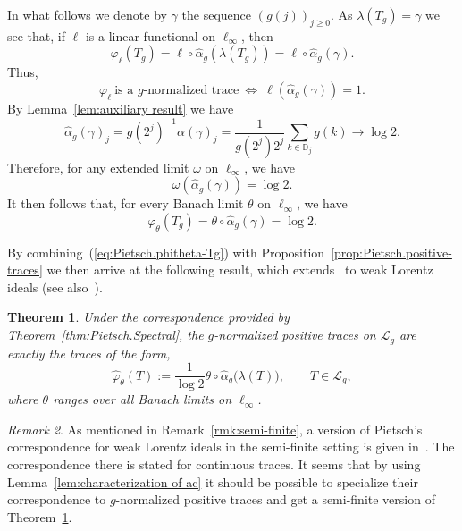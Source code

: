 \documentclass[10pt, a4paper]{amsart}
\newcommand{\D}{\mathbb{D}}
\newcommand{\sL}{\mathscr{L}}
\numberwithin{equation}{section}
\newtheorem{theorem}{Theorem}[section]
\theoremstyle{definition}
\theoremstyle{remark}
\newtheorem{remark}[theorem]{Remark}
\begin{document}
In what follows we denote by $\gamma$ the sequence $(g(j))_{j\geq 0}$. As $\lambda(T_{g})=\gamma$ we see that, if $\ell$ is a linear functional on $\ell_\infty$, then
\begin{equation*}
\varphi_\ell(T_{g})= \ell\circ\hat{\alpha}_g\left(\lambda(T_{g})\right)=  \ell\circ\hat{\alpha}_g(\gamma).
\end{equation*}
Thus,
\begin{equation*}
\varphi_\ell\ \text{is a $g$-normalized trace} \ \Longleftrightarrow\  \ell\left(\hat{\alpha}_g(\gamma)\right)=1.
\end{equation*}
By Lemma~\ref{lem:auxiliary result} we have
\begin{equation*}
 \hat{\alpha}_g(\gamma)_j = g(2^j)^{-1}\alpha(\gamma)_j=  \frac{1}{g(2^j)2^j} \sum_{k\in \D_j}g(k)\longrightarrow \log 2.
\end{equation*}
Therefore, for any extended limit $\omega$ on $\ell_\infty$, we have
\begin{equation*}
 \omega( \hat{\alpha}_g(\gamma))= \log 2.
\end{equation*}
It then follows that, for every Banach limit $\theta$ on $\ell_\infty$, we have
\begin{equation}\label{eq:Pietsch.phitheta-Tg}
 \varphi_\theta(T_g)= \theta\circ \hat{\alpha}_g(\gamma)= \log 2.
\end{equation}

By combining~(\ref{eq:Pietsch.phitheta-Tg}) with Proposition~\ref{prop:Pietsch.positive-traces} we then arrive at the following result, which extends~\cite[Theorem~6.1.1(a)]{LSZ:Book} to weak Lorentz ideals (see also~\cite[Corollary~4.2]{SSUZ:AIM15}).

 \begin{theorem}\label{thm:Pietsch.PNT}
 Under the correspondence provided by Theorem~\ref{thm:Pietsch.Spectral}, the $g$-normalized positive traces on $\sL_g$ are exactly the traces of the form,
 \begin{equation*}
\hat{\varphi}_\theta(T):= \frac{1}{\log 2}\theta\circ \hat{\alpha}_g\big(\lambda(T)\big), \qquad T\in \sL_g,
\end{equation*}
where $\theta$ ranges over all Banach limits on $\ell_\infty$.
\end{theorem}

\begin{remark}
As mentioned in Remark~\ref{rmk:semi-finite}, a version of Pietsch's correspondence for weak Lorentz ideals in the semi-finite setting is given in~\cite{LU:JMAA25}.  The correspondence there is stated for continuous traces. It seems that by using Lemma~\ref{lem:characterization of ac} it should be possible to specialize their correspondence to $g$-normalized positive traces and get a semi-finite version of Theorem~\ref{thm:Pietsch.PNT}.
\end{remark}
\end{document}
